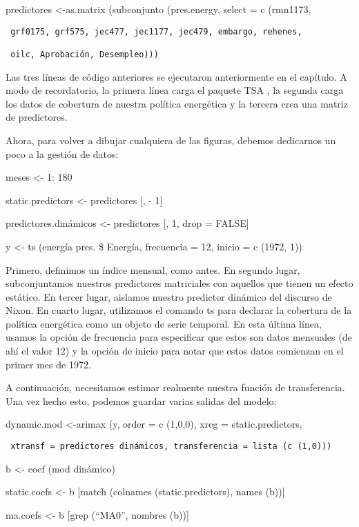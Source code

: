 \documentclass[
]{book}
\begin{document}
predictores \textless-as.matrix (subconjunto (pres.energy, select = c (rmn1173,

\begin{verbatim}
 grf0175, grf575, jec477, jec1177, jec479, embargo, rehenes,

 oilc, Aprobación, Desempleo)))
\end{verbatim}

Las tres líneas de código anteriores se ejecutaron anteriormente en el capítulo. A modo de recordatorio, la primera línea carga el paquete TSA , la segunda carga los datos de cobertura de nuestra política energética y la tercera crea una matriz de predictores.

Ahora, para volver a dibujar cualquiera de las figuras, debemos dedicarnos un poco a la gestión de datos:

meses \textless- 1: 180

static.predictors \textless- predictores {[}, - 1{]}

predictores.dinámicos \textless- predictores {[}, 1, drop = FALSE{]}

y \textless- ts (energía pres. \$ Energía, frecuencia = 12, inicio = c (1972, 1))

Primero, definimos un índice mensual, como antes. En segundo lugar, subconjuntamos nuestros predictores matriciales con aquellos que tienen un efecto estático. En tercer lugar, aislamos nuestro predictor dinámico del discurso de Nixon. En cuarto lugar, utilizamos el comando ts para declarar la cobertura de la política energética como un objeto de serie temporal. En esta última línea, usamos la opción de frecuencia para especificar que estos son datos mensuales (de ahí el valor 12) y la opción de inicio para notar que estos datos comienzan en el primer mes de 1972.

A continuación, necesitamos estimar realmente nuestra función de transferencia. Una vez hecho esto, podemos guardar varias salidas del modelo:

dynamic.mod \textless-arimax (y, order = c (1,0,0), xreg = static.predictors,

\begin{verbatim}
 xtransf = predictores dinámicos, transferencia = lista (c (1,0)))
\end{verbatim}

b \textless- coef (mod dinámico)

static.coefs \textless- b {[}match (colnames (static.predictors), names (b)){]}

ma.coefs \textless- b {[}grep (``MA0'', nombres (b)){]}
\end{document}
